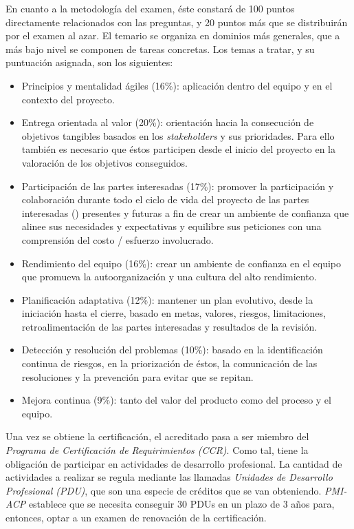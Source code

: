 En cuanto a la metodología del examen, éste constará de 100 puntos directamente relacionados con las preguntas, y 20 puntos más que se distribuirán por el examen al azar. El temario se organiza en dominios más generales, que a más bajo nivel se componen de tareas concretas. Los temas a tratar, y su puntuación asignada, son los siguientes:
\begin{itemize}
	\item Principios y mentalidad ágiles (16\%): aplicación dentro del equipo y en el contexto del proyecto.
	\item Entrega orientada al valor (20\%): orientación hacia la consecución de objetivos tangibles basados en los \emph{stakeholders} y sus prioridades. Para ello también es necesario que éstos participen desde el inicio del proyecto en la valoración de los objetivos conseguidos.
	\item Participación de las partes interesadas (17\%): promover la participación y colaboración durante todo el ciclo de vida del proyecto de las partes interesadas () presentes y futuras a fin de crear un ambiente de confianza que alinee sus necesidades y expectativas y equilibre sus peticiones con una comprensión del costo / esfuerzo involucrado.
	\item Rendimiento del equipo (16\%): crear un ambiente de confianza en el equipo que promueva la autoorganización y una cultura del alto rendimiento.
	\item Planificación adaptativa (12\%): mantener un plan evolutivo, desde la iniciación hasta el cierre, basado en metas, valores, riesgos, limitaciones, retroalimentación de las partes interesadas y resultados de la revisión.
	\item Detección y resolución del problemas (10\%): basado en la identificación continua de riesgos, en la priorización de éstos, la comunicación de las resoluciones y la prevención para evitar que se repitan.
	\item Mejora continua (9\%): tanto del valor del producto como del proceso y el equipo.
\end{itemize}

Una vez se obtiene la certificación, el acreditado pasa a ser miembro del \emph{Programa de Certificación de Requirimientos (CCR)}. Como tal, tiene la obligación de participar en actividades de desarrollo profesional. La cantidad de actividades a realizar se regula mediante las llamadas \emph{Unidades de Desarrollo Profesional (PDU)}, que son una especie de créditos que se van obteniendo. \emph{PMI-ACP} establece que se necesita conseguir 30 PDUs en un plazo de 3 años para, entonces, optar a un examen de renovación de la certificación.\\

